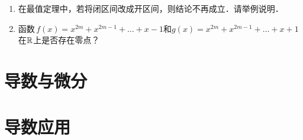 \documentclass[a4paper,punct=CCT]{ctexbook}
\theoremstyle{definition}
\theoremstyle{remark}
\newif\ifshowex
\newif\ifshowsolp
\let\geq\geqslant
\let\ge\geq}
\begin{document}
\begin{enumerate}
\item 在最值定理中，若将闭区间改成开区间，则结论不再成立．请举例说明．

  \ifshowsolp
  其实对于定义在开区间\(\paren{0,1}\)上的恒等函数\(f(x) = x\)这样的简单函数，既取不到最小值，又取不到最大值．更不用说像定义在开区间上的\(\paren{-π/2,π/2}\)上的正切函数\(f(x) = \tan x\)和定义在开区间\(\paren{-∞,+∞}\)上的反正切函数\(f(x) = \arctan x\)了．
  \fi

\item 函数\(\,f(x) = x^{2m} + x^{2m-1} + \dots + x - 1\)和\(g(x) = x^{2m} + x^{2m-1} + \dots + x + 1\)在\(\R\)上是否存在零点？

  \ifshowsolp
  此处假定\(m \ge 1\)．函数\(f\)在\(\R\)上显然是有零点的；因为\(f(0) = -1\)且\(f(1) = 2m-1 > 0\)，由定理\ref{thm:bolzano}可知它在\(\paren{-1,1}\)上至少有一个零点．函数\(f\)在\(\R\)上不存在零点，原因如下．有
  \begin{align*}
    g(x)
    &=
      \begin{dcases}
        1 + \sum_{k = 1}^{\smash{2m}} x^k, & x \ne 1, \\
        2m+1, & x = 1,
      \end{dcases} \\
    &=
      \begin{dcases}
        \frac{1-x^{2m+1}\negthickspace}{1-x}, & x \ne 1, \\
        2m+1, & x = 1.
      \end{dcases}
  \end{align*}
  可见函数\(g\)在\(\R\)上都是正数，因此无零点．
  \fi
\end{enumerate}

\ifshowex
\currentpdfbookmark{练习}{B1.3.1.E}
\subsection*{练习}

\begin{enumerate}
\item 下列说法中，正确的是\uline{\makebox[10em]{}}．
\end{enumerate}
\fi

\chapter{导数与微分}

\chapter{导数应用}
\end{document}
